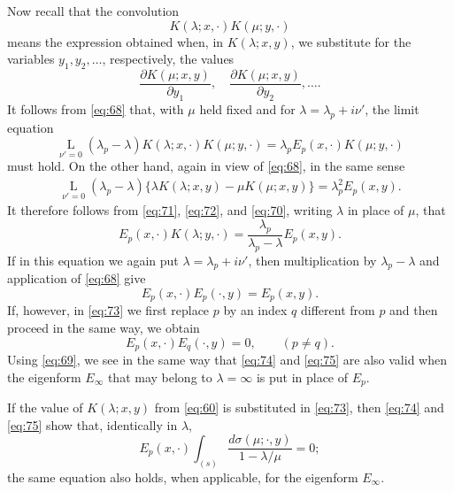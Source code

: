 \documentclass[b5paper,twoside]{article}
\newcommand{\originalpage}[1]{\phantomsection\label{origpage:#1}}
\begin{document}
Now recall that the convolution
\[
  K(\lambda;x,\mathord{\cdot})K(\mu;y,\mathord{\cdot})
\]
means the expression obtained when, in $K(\lambda;x,y)$, we substitute for
the variables $y_1,y_2,\ldots$, respectively, the values
\[
  \frac{\partial K(\mu;x,y)}{\partial y_1},
  \quad
  \frac{\partial K(\mu;x,y)}{\partial y_2},\ldots.
\]
It follows from \eqref{eq:68} that, with $\mu$ held fixed and
\originalpage{193}for $\lambda=\lambda_p+i\nu'$, the limit equation
\begin{equation}
\tag{71}\label{eq:71}
  \mathop{\mathrm{L}}\limits_{\nu'=0}
  (\lambda_p-\lambda)
  K(\lambda;x,\mathord{\cdot})K(\mu;y,\mathord{\cdot})
  =\lambda_pE_p(x,\mathord{\cdot})K(\mu;y,\mathord{\cdot})
\end{equation}
must hold.  On the other hand, again in view of \eqref{eq:68}, in the same
sense
\begin{equation}
\tag{72}\label{eq:72}
\begin{aligned}
  \mathop{\mathrm{L}}\limits_{\nu'=0}
  (\lambda_p-\lambda)
  \bigl\{\lambda K(\lambda;x,y)-\mu K(\mu;x,y)\bigr\}
  =\lambda_p^2E_p(x,y).
\end{aligned}
\end{equation}
It therefore follows from \eqref{eq:71}, \eqref{eq:72}, and
\eqref{eq:70}, writing $\lambda$ in place of $\mu$, that
\begin{equation}
\tag{73}\label{eq:73}
  E_p(x,\mathord{\cdot})K(\lambda;y,\mathord{\cdot})
  =\frac{\lambda_p}{\lambda_p-\lambda}E_p(x,y).
\end{equation}
If in this equation we again put $\lambda=\lambda_p+i\nu'$, then
multiplication by $\lambda_p-\lambda$ and application of \eqref{eq:68} give
\begin{equation}
\tag{74}\label{eq:74}
  E_p(x,\mathord{\cdot})E_p(\mathord{\cdot},y)=E_p(x,y).
\end{equation}
If, however, in \eqref{eq:73} we first replace $p$ by an index $q$ different
from $p$ and then proceed in the same way, we obtain
\begin{equation}
\tag{75}\label{eq:75}
  E_p(x,\mathord{\cdot})E_q(\mathord{\cdot},y)=0,
  \qquad(p\ne q).
\end{equation}
Using \eqref{eq:69}, we see in the same way that \eqref{eq:74} and
\eqref{eq:75} are also valid when the eigenform $E_\infty$ that may belong to
$\lambda=\infty$ is put in place of $E_p$.

If the value of $K(\lambda;x,y)$ from \eqref{eq:60} is substituted in
\eqref{eq:73}, then \eqref{eq:74} and \eqref{eq:75} show that, identically in
$\lambda$,
\begin{equation}
\tag{76}\label{eq:76}
  E_p(x,\mathord{\cdot})
  \int_{(s)}\frac{d\sigma(\mu;\mathord{\cdot},y)}{1-\lambda/\mu}=0;
\end{equation}
the same equation also holds, when applicable, for the eigenform $E_\infty$.
\end{document}
